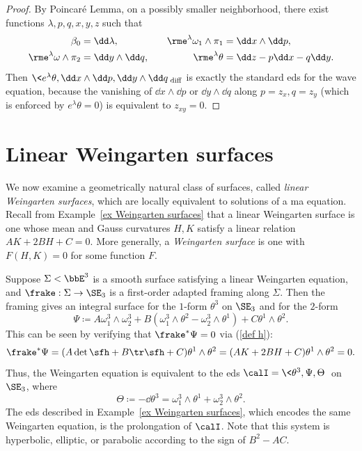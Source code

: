 \begin{proof}
    By Poincar\'e Lemma, on a possibly smaller neighborhood, there exist functions $\lambda,p,q,x,y,z$ such that 
    \begin{align}
        \beta_0&=\dd \lambda, \quad&
        \rme^{\lambda}\omega_1\wedge\pi_1&=\dd x\wedge \dd p,\\
        \rme^\lambda\omega\wedge\pi_2&=\dd y\wedge \dd q, \quad&
        \rme^\lambda\theta&=\dd z-p\dd x-q\dd y.
    \end{align}
    Then $\<e^\lambda\theta,\dd x\wedge\dd p,\dd y\wedge \dd q\>_{\mathrm{diff}}$ is exactly the standard \gls{eds} for the wave equation, because the vanishing of $\dd x\wedge\dd p$ or $\dd y\wedge \dd q$ along $p=z_x,q=z_y$ (which is enforced by $e^\lambda\theta=0$) is equivalent to $z_{xy}=0$.
\end{proof}








\section{Linear Weingarten surfaces}

We now examine a geometrically natural class of surfaces, called \emph{linear Weingarten surfaces}, which are locally equivalent to solutions of a \gls{ma} equation. Recall from Example~\ref{ex Weingarten surfaces} that a linear Weingarten surface is one whose mean and Gauss curvatures $H,K$ satisfy a linear relation $AK+2BH+C=0$. More generally, a \emph{Weingarten surface} is one with $F(H,K)=0$ for some function $F$.

Suppose $\Sigma <\bbE^3$ is a smooth surface satisfying a linear Weingarten equation, and $\frake:\Sigma\to \SE_3$ is a first-order adapted framing along $\Sigma$. Then the framing gives an integral surface for the $1$-form $\theta^3$ on $\SE_3$ and for the $2$-form 
\[\Psi\coloneqq A\omega_1^3 \wedge\omega_2^3+B(\omega_1^3\wedge\theta^2-\omega_2^3\wedge\theta^1)+C\theta^1\wedge\theta^2.\]
This can be seen by verifying that $\frake^\ast \Psi=0$ via (\ref{def h}):
\[\frake^\ast\Psi=(A\det \sfh+B\tr \sfh+C)\theta^1\wedge\theta^2=(AK+2BH+C)\theta^1\wedge\theta^2=0.\]
Thus, the Weingarten equation is equivalent to the \gls{eds} $\calI=\<\theta^3,\Psi,\Theta\>$ on $\SE_3$, where 
\[\Theta\coloneqq -\dd\theta^3=\omega_1^3\wedge\theta^1+\omega_2^3\wedge\theta^2.\]
The \gls{eds} described in Example~\ref{ex Weingarten surfaces}, which encodes the same Weingarten equation, is the prolongation of $\calI$. Note that this system is hyperbolic, elliptic, or parabolic according to the sign of $B^2-AC$.

